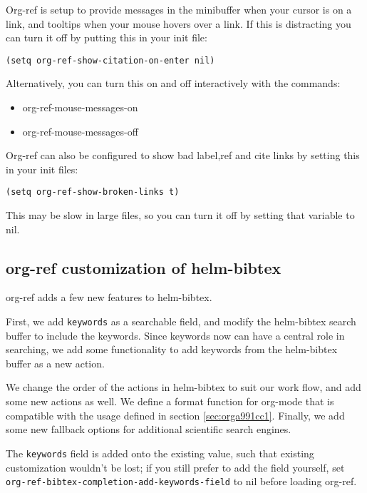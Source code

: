 \documentclass[11pt]{article}
\begin{document}
Org-ref is setup to provide messages in the minibuffer when your cursor is on a link, and tooltips when your mouse hovers over a link. If this is distracting you can turn it off by putting this in your init file:

\begin{verbatim}
(setq org-ref-show-citation-on-enter nil)
\end{verbatim}

Alternatively, you can turn this on and off interactively with the commands:

\begin{itemize}
\item org-ref-mouse-messages-on
\item org-ref-mouse-messages-off
\end{itemize}

Org-ref can also be configured to show bad label,ref and cite links by setting this in your init files:

\begin{verbatim}
(setq org-ref-show-broken-links t)
\end{verbatim}

This may be slow in large files, so you can turn it off by setting that variable to nil.

\subsection{org-ref customization of helm-bibtex}
\label{sec:org27a40e8}

org-ref adds a few new features to helm-bibtex.

First, we add \texttt{keywords} as a searchable field, and modify the helm-bibtex search buffer to include the keywords. Since keywords now can have a central role in searching, we add some functionality to add keywords from the helm-bibtex buffer as a new action.

We change the order of the actions in helm-bibtex to suit our work flow, and add some new actions as well. We define a format function for org-mode that is compatible with the usage defined in section \ref{sec:orga991cc1}. Finally, we add some new fallback options for additional scientific search engines.

The \texttt{keywords} field is added onto the existing value, such that existing customization wouldn’t be lost; if you still prefer to add the field yourself, set \texttt{org-ref-bibtex-completion-add-keywords-field} to nil before loading org-ref.
\end{document}
